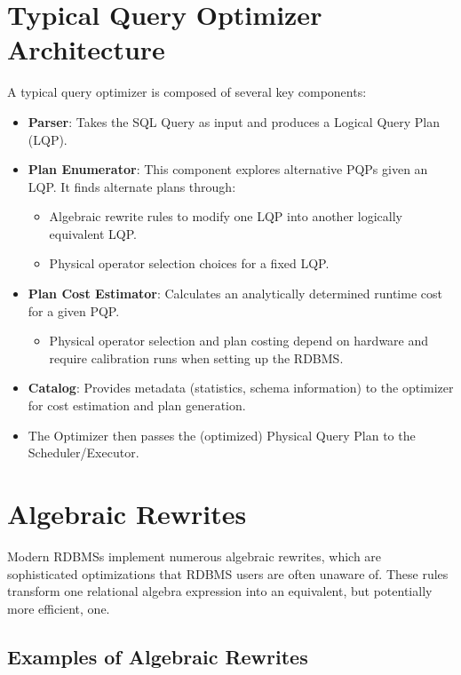 \documentclass{article}
\begin{document}
\section*{Typical Query Optimizer Architecture}
A typical query optimizer is composed of several key components:
\begin{itemize}
    \item \textbf{Parser}: Takes the SQL Query as input and produces a Logical Query Plan (LQP).
    \item \textbf{Plan Enumerator}: This component explores alternative PQPs given an LQP. It finds alternate plans through:
        \begin{itemize}
            \item Algebraic rewrite rules to modify one LQP into another logically equivalent LQP.
            \item Physical operator selection choices for a fixed LQP.
        \end{itemize}
    \item \textbf{Plan Cost Estimator}: Calculates an analytically determined runtime cost for a given PQP.
        \begin{itemize}
            \item Physical operator selection and plan costing depend on hardware and require calibration runs when setting up the RDBMS.
        \end{itemize}
    \item \textbf{Catalog}: Provides metadata (statistics, schema information) to the optimizer for cost estimation and plan generation.
    \item The Optimizer then passes the (optimized) Physical Query Plan to the Scheduler/Executor.
\end{itemize}

\section*{Algebraic Rewrites}
Modern RDBMSs implement numerous algebraic rewrites, which are sophisticated optimizations that RDBMS users are often unaware of. These rules transform one relational algebra expression into an equivalent, but potentially more efficient, one.

\subsection*{Examples of Algebraic Rewrites}
\end{document}
